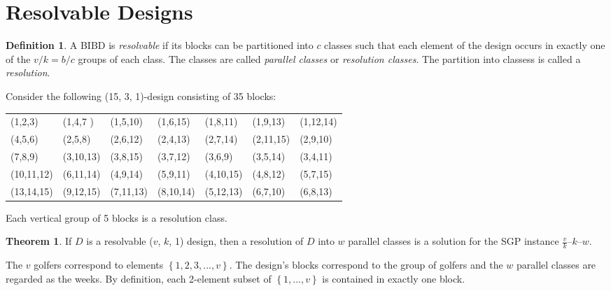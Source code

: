 \documentclass[12pt]{article}
\theoremstyle{definition}
\newtheorem{thm}{Theorem}[section]
\newtheorem{mydef}{Definition}
\begin{document}
\section{Resolvable Designs}
\begin{mydef}
A BIBD is \textit{resolvable} if its blocks can be partitioned into $c$ classes such that each element of the design occurs in exactly one of the $v/k = b/c$ groups of each class. The classes are called \textit{parallel classes} or \textit{resolution classes}. The partition into classess is called a \textit{resolution}. \cite{Triska}
\end{mydef}
Consider the following (15, 3, 1)-design consisting of 35 blocks:
\begin{center}
\begin{tabular}{lllllll} 
(1,2,3) & (1,4,7 ) & (1,5,10) & (1,6,15) & (1,8,11) &  (1,9,13) & (1,12,14) \\
(4,5,6) & (2,5,8) & (2,6,12) & (2,4,13) &  (2,7,14) & (2,11,15) & (2,9,10) \\
(7,8,9) & (3,10,13) & (3,8,15) & (3,7,12) &  (3,6,9) & (3,5,14) & (3,4,11) \\
(10,11,12) & (6,11,14) & (4,9,14) & (5,9,11) &  (4,10,15) & (4,8,12) & (5,7,15) \\
(13,14,15) & (9,12,15) & (7,11,13) & (8,10,14) &  (5,12,13) & (6,7,10) & (6,8,13)
\end{tabular}
\end{center}

\begin{center}
Each vertical group of 5 blocks is a resolution class.
\end{center}
\begin{thm}
If $D$ is a resolvable ($v$, $k$, 1) design, then a resolution of $D$ into $w$ parallel classes is a solution for the SGP instance $\frac{v}{k}$--$k$--$w$. \cite{Triska}
\end{thm}
The $v$ golfers correspond to elements $\left\{1, 2, 3, ...,v\right\}$. The design's blocks correspond to the group of golfers and the $w$ parallel classes are regarded as the weeks. By definition, each 2-element subset of $\left\{1, ...,v\right\}$ is contained in exactly one block. \cite{Triska}
\end{document}

